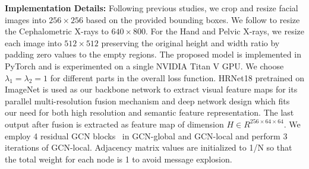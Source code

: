 \documentclass[runningheads]{llncs}
\begin{document}
\noindent\textbf{Implementation Details:} Following previous studies, we crop and resize facial images into $256 \times 256$ based on the provided bounding boxes. We follow \cite{chen2019cephalometric} to resize the Cephalometric X-rays to $640 \times 800$. For the Hand and Pelvic X-rays, we resize each image into $512 \times 512$ preserving the original height and width ratio by padding zero values to the empty regions. The proposed model is implemented in PyTorch and is experimented on a single NVIDIA Titan V GPU. We choose $\lambda_1 = \lambda_2 = 1$ for different parts in the overall loss function. HRNet18 \cite{sun2019deep} pretrained on ImageNet is used as our backbone network to extract visual feature maps for its parallel multi-resolution fusion mechanism and deep network design which fits our need for both high resolution and semantic feature representation. The last output after fusion is extracted as feature map of dimension $H\in \!R^{256 \times 64 \times 64}$. We employ 4 residual GCN blocks~\cite{ling2019fast,li2019can} in GCN-global and GCN-local and perform 3 iterations of GCN-local. Adjacency matrix values are initialized to 1/N so that the total weight for each node is 1 to avoid message explosion. 
\end{document}
